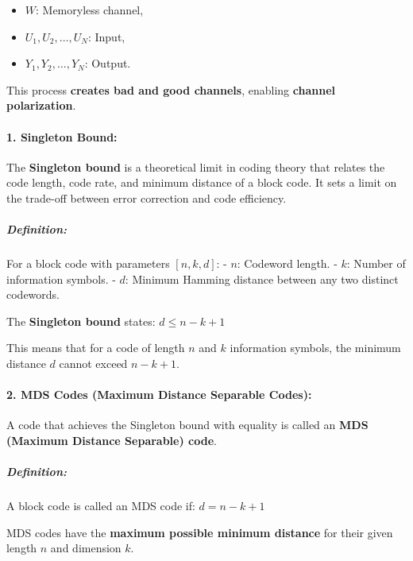 \documentclass[11pt]{article}
\providecommand{\tightlist}{%
      \setlength{\itemsep}{0pt}\setlength{\parskip}{0pt}}
\begin{document}
\begin{itemize}
\tightlist
\item
  \(W\): Memoryless channel,
\item
  \(U_1, U_2, \dots, U_N\): Input,
\item
  \(Y_1, Y_2, \dots, Y_N\): Output.
\end{itemize}

This process \textbf{creates bad and good channels}, enabling
\textbf{channel polarization}.

    \paragraph{\texorpdfstring{\textbf{1. Singleton
Bound:}}{1. Singleton Bound:}}\label{singleton-bound}

The \textbf{Singleton bound} is a theoretical limit in coding theory
that relates the code length, code rate, and minimum distance of a block
code. It sets a limit on the trade-off between error correction and code
efficiency.

\subparagraph{\texorpdfstring{\textbf{Definition:}}{Definition:}}\label{definition}

For a block code with parameters \([n, k, d]\): - \(n\): Codeword
length. - \(k\): Number of information symbols. - \(d\): Minimum Hamming
distance between any two distinct codewords.

The \textbf{Singleton bound} states: \(d \leq n - k + 1\)

This means that for a code of length \(n\) and \(k\) information
symbols, the minimum distance \(d\) cannot exceed \(n - k + 1\).

\paragraph{\texorpdfstring{\textbf{2. MDS Codes (Maximum Distance
Separable
Codes):}}{2. MDS Codes (Maximum Distance Separable Codes):}}\label{mds-codes-maximum-distance-separable-codes}

A code that achieves the Singleton bound with equality is called an
\textbf{MDS (Maximum Distance Separable) code}.

\subparagraph{\texorpdfstring{\textbf{Definition:}}{Definition:}}\label{definition-1}

A block code is called an MDS code if: \(d = n - k + 1\)

MDS codes have the \textbf{maximum possible minimum distance} for their
given length \(n\) and dimension \(k\).
\end{document}
